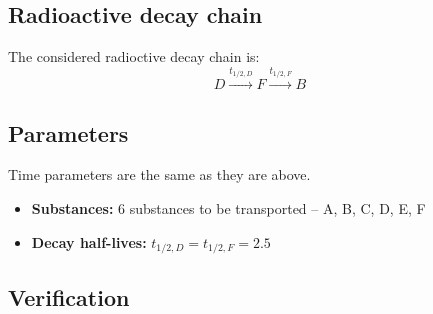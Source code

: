\subsection{Radioactive decay chain}
The considered radioctive decay chain is:
\[
 D\xrightarrow{t_{1/2,D}}F\xrightarrow{t_{1/2,F}}B
\]
\subsection*{Parameters}
Time parameters are the same as they are above.
\begin{itemize}
  \item \textbf{Substances:} 6 substances to be transported -- A, B, C, D, E, F
  \item \textbf{Decay half-lives:} $t_{1/2,D} = t_{1/2,F} = 2.5$
\end{itemize}

\subsection*{Verification}



